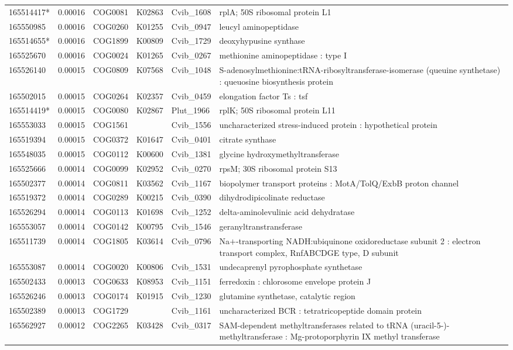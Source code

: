\begin{landscape}
\begin{longtable}{p{1.6cm}p{1.2cm}p{1.5cm}p{1.5cm}p{2.8cm}p{13.5cm}}
165514417*&0.00016&COG0081&K02863&Cvib\_1608&rplA; 50S ribosomal protein L1 \\
165550985&0.00016&COG0260&K01255&Cvib\_0947&leucyl aminopeptidase \\
165514655*&0.00016&COG1899&K00809&Cvib\_1729&deoxyhypusine synthase \\
165525670&0.00016&COG0024&K01265&Cvib\_0267&methionine aminopeptidase : type I \\
165526140&0.00015&COG0809&K07568&Cvib\_1048&S-adenosylmethionine:tRNA-ribosyltransferase-isomerase (queuine synthetase) : queuosine biosynthesis protein \\
165502015&0.00015&COG0264&K02357&Cvib\_0459&elongation factor Ts : tsf \\
165514419*&0.00015&COG0080&K02867&Plut\_1966&rplK; 50S ribosomal protein L11 \\
165553033&0.00015&COG1561&&Cvib\_1556&uncharacterized stress-induced protein : hypothetical protein \\
165519394&0.00015&COG0372&K01647&Cvib\_0401&citrate synthase \\
165548035&0.00015&COG0112&K00600&Cvib\_1381&glycine hydroxymethyltransferase \\
165525666&0.00014&COG0099&K02952&Cvib\_0270&rpsM; 30S ribosomal protein S13 \\
165502377&0.00014&COG0811&K03562&Cvib\_1167&biopolymer transport proteins : MotA/TolQ/ExbB proton channel \\
165519372&0.00014&COG0289&K00215&Cvib\_0390&dihydrodipicolinate reductase \\
165526294&0.00014&COG0113&K01698&Cvib\_1252&delta-aminolevulinic acid dehydratase \\
165553057&0.00014&COG0142&K00795&Cvib\_1546&geranyltranstransferase \\
165511739&0.00014&COG1805&K03614&Cvib\_0796&Na$+$-transporting NADH:ubiquinone oxidoreductase subunit 2 : electron transport complex, RnfABCDGE type, D subunit \\
165553087&0.00014&COG0020&K00806&Cvib\_1531&undecaprenyl pyrophosphate synthetase \\
165502433&0.00013&COG0633&K08953&Cvib\_1151&ferredoxin : chlorosome envelope protein J \\
165526246&0.00013&COG0174&K01915&Cvib\_1230&glutamine synthetase, catalytic region \\
165502389&0.00013&COG1729&&Cvib\_1161&uncharacterized BCR : tetratricopeptide domain protein \\
165562927&0.00012&COG2265&K03428&Cvib\_0317&SAM-dependent methyltransferases related to tRNA (uracil-5-)-methyltransferase : Mg-protoporphyrin IX methyl transferase \\

\end{longtable}
\end{landscape}
